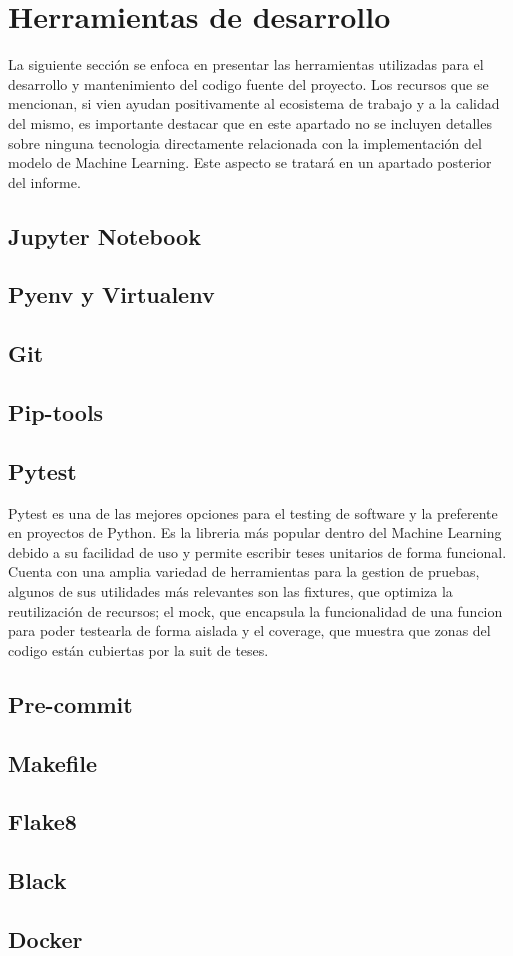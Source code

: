 \section{Herramientas de desarrollo}
    La siguiente sección se enfoca en presentar las herramientas utilizadas para el desarrollo y  
    mantenimiento del codigo fuente del proyecto. Los recursos que se mencionan, si vien ayudan positivamente 
    al ecosistema de trabajo y a la calidad del mismo, es importante destacar que en este apartado no se incluyen 
    detalles sobre ninguna tecnologia directamente relacionada con la implementación del modelo de Machine Learning. 
    Este aspecto se tratará en un apartado posterior del informe.

    \subsection{Jupyter Notebook}

    \subsection{Pyenv y Virtualenv}

    \subsection{Git}

    \subsection{Pip-tools}

    \subsection{Pytest}
    Pytest es una de las mejores opciones para el testing de software y la preferente en proyectos de Python. 
    Es la libreria más popular dentro del Machine Learning debido a su facilidad de uso y  
    permite escribir teses unitarios de forma funcional. Cuenta con una amplia variedad 
    de herramientas para la gestion de pruebas, algunos de sus utilidades más relevantes son las fixtures, que
    optimiza la reutilización de recursos; el mock, que encapsula la funcionalidad de una funcion para poder
    testearla de forma aislada y el coverage, que muestra que zonas del codigo están cubiertas por la suit de teses. 

    \subsection{Pre-commit}

    \subsection{Makefile}

    \subsection{Flake8}

    \subsection{Black}
    
    \subsection{Docker}
    

\pagebreak